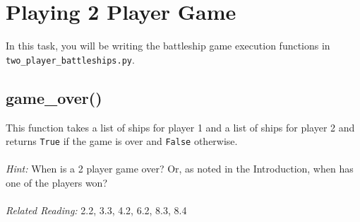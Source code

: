 \documentclass{article}
\begin{document}
\section{Playing 2 Player Game}
In this task, you will be writing the battleship game execution functions in \texttt{two\_player\_battleships.py}.

\subsection{game\_over()}
This function takes a list of ships for player 1 and a list of ships for player 2 and returns \texttt{True} if the game is over and \texttt{False} otherwise.\\\\
\textit{Hint:} When is a 2 player game over? Or, as noted in the Introduction, when has one of the players won?\\\\
\textit{Related Reading:} 2.2, 3.3, 4.2, 6.2, 8.3, 8.4
\end{document}
